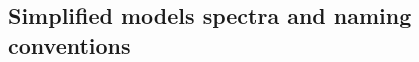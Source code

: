 \subsection{Simplified models spectra and naming conventions}
\def\chitz{\ensuremath{\widetilde{\chi}^0_2}}
\def\chiz{\ensuremath{\widetilde{\chi}^0_1}}
\def\chipm{\ensuremath{\widetilde{\chi}^\pm_1}}
\def\chimp{\ensuremath{\widetilde{\chi}^\mp_1}}
\def\gl{\tilde{g}}
\def\sTop{\ensuremath{\tilde{t}}\xspace}
\def\st{\ensuremath{\tilde{t}}\xspace}
\def\slep{\ensuremath{\tilde{l}}\xspace}
\def\snu{\ensuremath{\tilde{\nu}}\xspace}
\def\sBottom{\tilde{b}}
\def\sb{\tilde{b}}
\def\sq{\tilde{q}}
\def\sb{\tilde{b}}
\def\st{\tilde{t}}
\def\fb{\mathrm{fb}}
\def\first{1$^\mathrm{st}$}
\def\second{2$^\mathrm{nd}$\xspace}
\def\third{3$^\mathrm{rd}$\xspace}
\def\spacer{\hspace*{10mm} }
\newcommand\fixme[1]{{\color{red}FIXME #1}}
\newcommand\model[1]{{\tt #1}}
\newcommand\url[1]{{\nopagebreak{\tt #1}}}
\newcommand\smallurl[1]{{\small \tt #1}}
\newcommand{\AlphaT}{\ensuremath{\alpha_{\mathrm{T}}}\xspace} 
\newcommand{\ATLLepStop}{ATL lep-$\tilde{t}$}
\newcommand{\ATLHadStop}{ATL had-$\tilde{t}$}
\newcommand{\SSnoHT}{SSnoH$_{\mathrm{T}}$}
\newcommand{\HsTjets}{\ensuremath{\not\!\!\mathrm{H}_{\mathrm{T}}}+jets\xspace}
\newcommand{\MTtwo}{\ensuremath{{M}_{\mathrm{T2}}}\xspace}  
\newcommand{\emu}{\ensuremath{e/\mu}\xspace}
\newcommand{\ETslash}{\ensuremath{\not\!\!\rm{E}_{\mathrm{T}}}\xspace} 
\newcommand{\ZMET}{Z+\ETslash}
\newcommand{\sigmaXBF}{\mbox{\ensuremath{\sigma\times\mathcal{B}}}\xspace}

